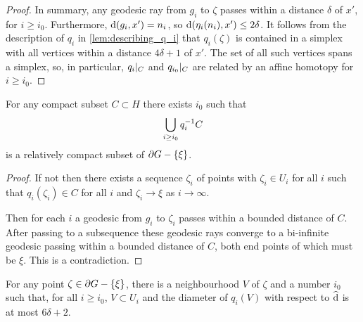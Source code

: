 \documentclass[a4paper]{article}
\begin{document}
\begin{proof}
  In summary, any geodesic ray from $g_i$ to $\zeta$ passes within a distance 
  $\delta$ of $x'$, for $i\geq i_0$. Furthermore, $\operatorname{d}(g_i,x') = n_i$, so 
  $\operatorname{d}(\eta_i(n_i), x')\leq 2\delta$. It follows from the description of
  $q_i$ in \cref{lem:describing_q_i} that $q_i(\zeta)$ is contained in a
  simplex with all vertices within a distance $4\delta+1$ of $x'$. The set of
  all such vertices spans a simplex, so, in particular, $q_i\vert_{C}$ and
  $q_{i_0}\vert_{C}$ are related by an affine homotopy for $i \geq i_0$. 
\end{proof}

\begin{lemma}\label{lem:propermaps} 
  For any compact subset $C \subset H$ there exists $i_0$ such that
  \begin{equation*}
    \bigcup_{i\geq i_0} q_i^{-1} C
  \end{equation*}
  is a relatively compact subset of $\partial G - \left\{\xi\right\}$.
\end{lemma}

\begin{proof}
  If not then there exists a sequence $\zeta_i$ of points with $\zeta_i \in U_i$ 
  for all $i$ such that $q_i(\zeta_i) \in C$ for all $i$ and $\zeta_i \to \xi$ 
  as $i \to \infty$.

  Then for each $i$ a geodesic from $g_i$ to $\zeta_i$ passes within a bounded
  distance of $C$. After passing to a subsequence these geodesic rays converge
  to a bi-infinite geodesic passing within a bounded distance of $C$, both end
  points of which must be $\xi$. This is a contradiction.
\end{proof}

\begin{lemma}\label{lem:uniform_continuity}
  For any point $\zeta \in \partial G - \left\{\xi\right\}$, there is a neighbourhood $V$
  of $\zeta$ and a number $i_0$ such that, for all $i \geq i_0$, $V \subset U_i$ 
  and the diameter of $q_i(V)$ with respect to $\operatorname{\widehat{d}}$ is at most $6\delta+2$.
\end{lemma}
\end{document}
